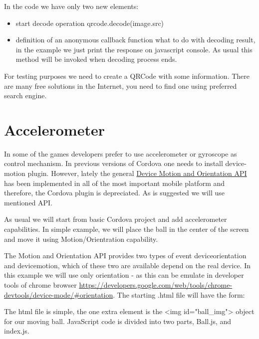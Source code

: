 \begin{explain}
  In the code we have only two new elements:
  \begin{itemize}
  \item start decode operation qrcode.decode(image.src)
  \item definition of an anonymous callback function what to do with decoding result, in the example we just print the response on javascript console. As usual this method will be invoked when decoding process ends.
  \end{itemize}
\end{explain}

\begin{remark}
For testing purposes we need to create a QRCode with some information. There are many free solutions in the Internet, you need to find one using preferred search engine.
\end{remark}

\section{Accelerometer}
In some of the games developers prefer to use accelerometer or gyroscope as control mechanism. In previous versions of Cordova one needs to install device-motion plugin. However, lately the general \href{https://www.w3.org/TR/2016/CR-orientation-event-20160818/}{Device Motion and Orientation API}  has been implemented in all of the most important mobile platform and therefore, the Cordova plugin is depreciated. As is suggested we will use mentioned API.

As usual we will start from basic Cordova project and add accelerometer capabilities. In simple example, we will place the ball in the center of the screen and move it using Motion/Orientration capability.

The Motion and Orientation API provides two types of event deviceorientation and devicemotion, which of these two are available depend on the real device. In this example we will use only orientation - as this can be emulate in developer tools of chrome browser \url{https://developers.google.com/web/tools/chrome-devtools/device-mode/#orientation}. The starting .html file will have the form:


\begin{explain}
The html file is simple, the one extra element is the <img id="ball\_img"> object for our moving ball. JavaScript code is divided into two parts, Ball.js, and index.js.
\end{explain}

